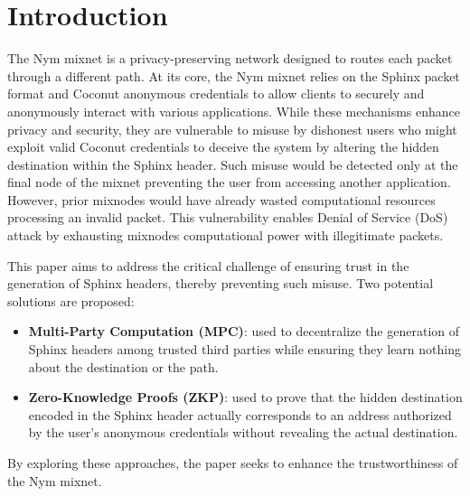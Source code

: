 \section{Introduction}

The Nym mixnet \cite{nym} is a privacy-preserving network designed to routes each packet through a different path.
At its core, the Nym mixnet relies on the Sphinx \cite{sphinx} packet format and Coconut \cite{coconut} anonymous credentials to allow clients to securely and anonymously interact with various applications.
While these mechanisms enhance privacy and security, they are vulnerable to misuse by dishonest users who might exploit valid Coconut credentials to deceive the system by altering the hidden destination within the Sphinx header.
Such misuse would be detected only at the final node of the mixnet preventing the user from accessing another application. 
However, prior mixnodes would have already wasted computational resources processing an invalid packet. 
This vulnerability enables Denial of Service (DoS) attack by exhausting mixnodes computational power with illegitimate packets.
\newline
{}

This paper aims to address the critical challenge of ensuring trust in the generation of Sphinx headers, thereby preventing such misuse. 
Two potential solutions are proposed: 
\begin{itemize}
    \item \textbf{Multi-Party Computation (MPC)}:
    used to decentralize the generation of Sphinx headers among trusted third parties while ensuring they learn nothing about the destination or the path.
    \item \textbf{Zero-Knowledge Proofs (ZKP)}: used to prove that the hidden destination encoded in the Sphinx header actually corresponds to an address authorized by the user’s anonymous credentials without revealing the actual destination. 
\end{itemize}
By exploring these approaches, the paper seeks to enhance the trustworthiness of the Nym mixnet.
